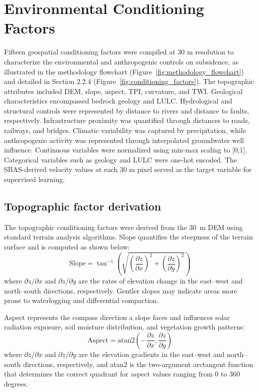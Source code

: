 \documentclass[oneside,doublespacing,flushright]{lsuthesis}
\begin{document}
\section{Environmental Conditioning Factors}
Fifteen geospatial conditioning factors were compiled at 30 m resolution to characterize the environmental and anthropogenic controls on subsidence, as illustrated in the methodology flowchart (Figure~\ref{fig:methodology_flowchart}) and detailed in Section 2.2.4 (Figure~\ref{fig:conditioning_factors}). The topographic attributes included DEM, slope, aspect, TPI, curvature, and TWI. Geological characteristics encompassed bedrock geology and LULC. Hydrological and structural controls were represented by distance to rivers and distance to faults, respectively. Infrastructure proximity was quantified through distances to roads, railways, and bridges. Climatic variability was captured by precipitation, while anthropogenic activity was represented through interpolated groundwater well influence. Continuous variables were normalized using min-max scaling to [0,1]. Categorical variables such as geology and LULC were one-hot encoded. The SBAS-derived velocity values at each 30 m pixel served as the target variable for supervised learning.

\subsection{Topographic factor derivation}
The topographic conditioning factors were derived from the 30~m DEM using standard terrain analysis algorithms. Slope quantifies the steepness of the terrain surface and is computed as shown below:
\begin{equation}
\text{Slope} = \tan^{-1}\!\left(\sqrt{\left(\frac{\partial z}{\partial x}\right)^{\!2} + \left(\frac{\partial z}{\partial y}\right)^{\!2}}\right)
\end{equation}
where $\partial z/\partial x$ and $\partial z/\partial y$ are the rates of elevation change in the east--west and north--south directions, respectively. Gentler slopes may indicate areas more prone to waterlogging and differential compaction.

Aspect represents the compass direction a slope faces and influences solar radiation exposure, soil moisture distribution, and vegetation growth patterns:
\begin{equation}
\text{Aspect} = \text{atan2}\left(-\frac{\partial z}{\partial x}, \frac{\partial z}{\partial y}\right)
\end{equation}
where $\partial z/\partial x$ and $\partial z/\partial y$ are the elevation gradients in the east--west and north--south directions, respectively, and atan2 is the two-argument arctangent function that determines the correct quadrant for aspect values ranging from 0 to 360 degrees.
\end{document}
